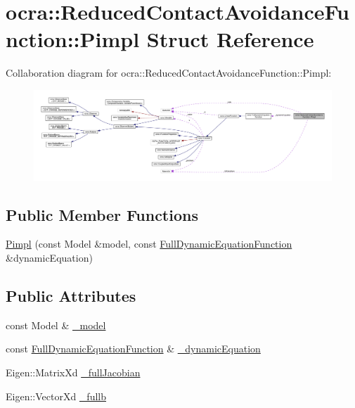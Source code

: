 \hypertarget{structReducedContactAvoidanceFunction_1_1Pimpl}{}\section{ocra\+:\+:Reduced\+Contact\+Avoidance\+Function\+:\+:Pimpl Struct Reference}
\label{structReducedContactAvoidanceFunction_1_1Pimpl}


Collaboration diagram for ocra\+:\+:Reduced\+Contact\+Avoidance\+Function\+:\+:Pimpl\+:\nopagebreak
\begin{figure}[H]
\begin{center}
\leavevmode
\includegraphics[width=350pt]{d9/d98/structReducedContactAvoidanceFunction_1_1Pimpl__coll__graph}
\end{center}
\end{figure}
\subsection*{Public Member Functions}
\begin{DoxyCompactItemize}
\item 
\hyperlink{structReducedContactAvoidanceFunction_1_1Pimpl_ab7258766eea3fd037b4e59e381adfdd5}{Pimpl} (const Model \&model, const \hyperlink{classocra_1_1FullDynamicEquationFunction}{Full\+Dynamic\+Equation\+Function} \&dynamic\+Equation)
\end{DoxyCompactItemize}
\subsection*{Public Attributes}
\begin{DoxyCompactItemize}
\item 
const Model \& \hyperlink{structReducedContactAvoidanceFunction_1_1Pimpl_acd2bf5f47839d39cb37ac323e038558f}{\+\_\+model}
\item 
const \hyperlink{classocra_1_1FullDynamicEquationFunction}{Full\+Dynamic\+Equation\+Function} \& \hyperlink{structReducedContactAvoidanceFunction_1_1Pimpl_a2993139449f5c29b4a85a9e3c261834c}{\+\_\+dynamic\+Equation}
\item 
Eigen\+::\+Matrix\+Xd \hyperlink{structReducedContactAvoidanceFunction_1_1Pimpl_a6ddc277e90776add368eee6a56494f45}{\+\_\+full\+Jacobian}
\item 
Eigen\+::\+Vector\+Xd \hyperlink{structReducedContactAvoidanceFunction_1_1Pimpl_ade6d248f540e91b5b9cfe961981d03a3}{\+\_\+fullb}
\end{DoxyCompactItemize}


